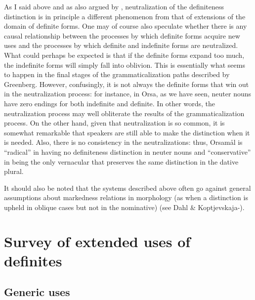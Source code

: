 As I said above and as also argued by \citet{Hummelstedt1934}, neutralization of the definiteness distinction is in principle a different phenomenon from that of extensions of the domain of definite forms. One may of course also speculate whether there is any causal relationship between the processes by which definite forms acquire new uses and the processes by which definite and indefinite forms are neutralized. What could perhaps be expected is that if the definite forms expand too much, the indefinite forms will simply fall into oblivion. This is essentially what seems to happen in the final stages of the grammaticalization paths described by Greenberg. However, confusingly, it is not always the definite forms that win out in the neutralization process: for instance, in Orsa, as we have seen, neuter nouns have zero endings for both indefinite and definite. In other words, the neutralization process may well obliterate the results of the grammaticalization process. On the other hand, given that neutralization is so common, it is somewhat remarkable that speakers are still able to make the distinction when it is needed. Also, there is no consistency in the neutralizations: thus, Orsamål is “radical” in having no definiteness distinction in neuter nouns and “conservative” in being the only vernacular that preserves the same distinction in the dative plural.

It should also be noted that the systems described above often go against general assumptions about markedness relations in morphology (as when a distinction is upheld in oblique cases but not in the nominative) (see Dahl \& Koptjevskaja-\citet{Tamm2006}).

\section{ Survey of extended uses of definites}
\label{bkm:Ref105226591}\subsection{ Generic uses}
\label{bkm:Ref154983693}

